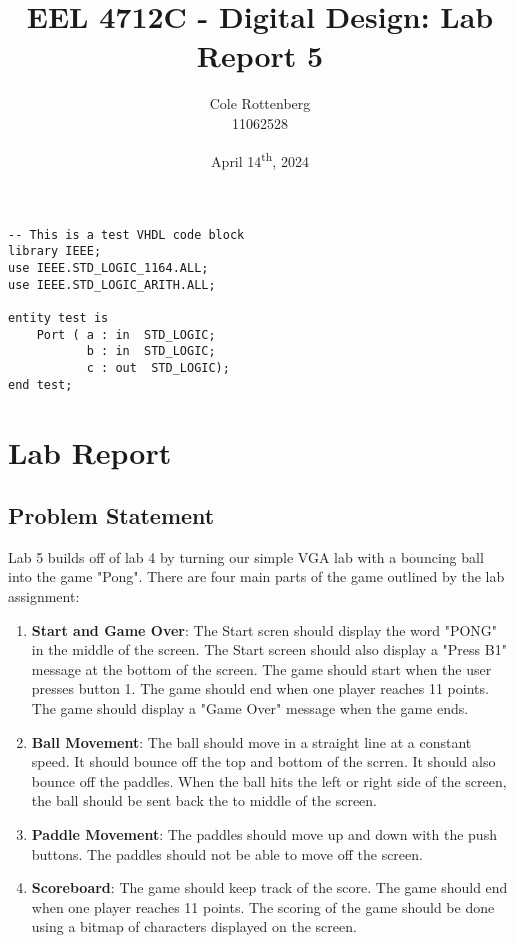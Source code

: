 \documentclass{article}
\title{EEL 4712C - Digital Design: Lab Report 5}
\author{Cole Rottenberg \\ 11062528}
\date{April 14\textsuperscript{th}, 2024}
\begin{document}
\maketitle

\begin{lstlisting}[caption=Test VHDL Code, label=lst:test-vhdl-code]
-- This is a test VHDL code block
library IEEE;
use IEEE.STD_LOGIC_1164.ALL;
use IEEE.STD_LOGIC_ARITH.ALL;

entity test is
    Port ( a : in  STD_LOGIC;
           b : in  STD_LOGIC;
           c : out  STD_LOGIC);
end test;
\end{lstlisting}

\section*{Lab Report}

\subsection*{Problem Statement}
Lab 5 builds off of lab 4 by turning our simple VGA lab with a bouncing ball into the game "Pong". There are four main parts of the game outlined by the lab assignment:
\begin{enumerate}
  \item \textbf{Start and Game Over}: The Start scren should display the word "PONG" in the middle of the screen. The Start screen should also display a "Press B1" message at the bottom of the screen. The game should start when the user presses button 1. The game should end when one player reaches 11 points. The game should display a "Game Over" message when the game ends.
  \item \textbf{Ball Movement}: The ball should move in a straight line at a constant speed. It should bounce off the top and bottom of the scrren. It should also bounce off the paddles. When the ball hits the left or right side of the screen, the ball should be sent back the to middle of the screen.
  \item \textbf{Paddle Movement}: The paddles should move up and down with the push buttons. The paddles should not be able to move off the screen.
  \item \textbf{Scoreboard}: The game should keep track of the score. The game should end when one player reaches 11 points. The scoring of the game should be done using a bitmap of characters displayed on the screen.
\end{enumerate}
\end{document}
